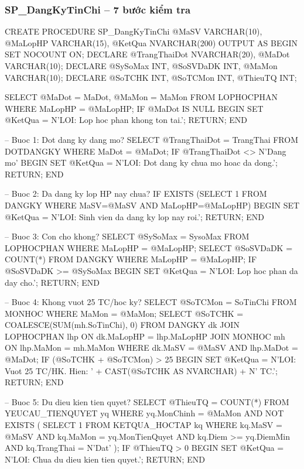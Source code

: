 \documentclass[13pt, a4paper]{article}
\begin{document}
\subsubsection{SP\_DangKyTinChi -- 7 bước kiểm tra}

\begin{sqlbox}
CREATE PROCEDURE SP_DangKyTinChi
    @MaSV    VARCHAR(10),
    @MaLopHP VARCHAR(15),
    @KetQua  NVARCHAR(200) OUTPUT
AS
BEGIN
    SET NOCOUNT ON;
    DECLARE @TrangThaiDot NVARCHAR(20), @MaDot VARCHAR(10);
    DECLARE @SySoMax INT, @SoSVDaDK INT, @MaMon VARCHAR(10);
    DECLARE @SoTCHK INT, @SoTCMon INT, @ThieuTQ INT;

    SELECT @MaDot = MaDot, @MaMon = MaMon
    FROM LOPHOCPHAN WHERE MaLopHP = @MaLopHP;
    IF @MaDot IS NULL
    BEGIN SET @KetQua = N'LOI: Lop hoc phan khong ton tai.'; RETURN; END

    -- Buoc 1: Dot dang ky dang mo?
    SELECT @TrangThaiDot = TrangThai FROM DOTDANGKY WHERE MaDot = @MaDot;
    IF @TrangThaiDot <> N'Dang mo'
    BEGIN SET @KetQua = N'LOI: Dot dang ky chua mo hoac da dong.'; RETURN; END

    -- Buoc 2: Da dang ky lop HP nay chua?
    IF EXISTS (SELECT 1 FROM DANGKY WHERE MaSV=@MaSV AND MaLopHP=@MaLopHP)
    BEGIN SET @KetQua = N'LOI: Sinh vien da dang ky lop nay roi.'; RETURN; END

    -- Buoc 3: Con cho khong?
    SELECT @SySoMax = SysoMax FROM LOPHOCPHAN WHERE MaLopHP = @MaLopHP;
    SELECT @SoSVDaDK = COUNT(*) FROM DANGKY WHERE MaLopHP = @MaLopHP;
    IF @SoSVDaDK >= @SySoMax
    BEGIN SET @KetQua = N'LOI: Lop hoc phan da day cho.'; RETURN; END

    -- Buoc 4: Khong vuot 25 TC/hoc ky?
    SELECT @SoTCMon = SoTinChi FROM MONHOC WHERE MaMon = @MaMon;
    SELECT @SoTCHK = COALESCE(SUM(mh.SoTinChi), 0)
    FROM DANGKY dk JOIN LOPHOCPHAN lhp ON dk.MaLopHP = lhp.MaLopHP
                   JOIN MONHOC mh     ON lhp.MaMon   = mh.MaMon
    WHERE dk.MaSV = @MaSV AND lhp.MaDot = @MaDot;
    IF (@SoTCHK + @SoTCMon) > 25
    BEGIN
        SET @KetQua = N'LOI: Vuot 25 TC/HK. Hien: '
                    + CAST(@SoTCHK AS NVARCHAR) + N' TC.'; RETURN;
    END

    -- Buoc 5: Du dieu kien tien quyet?
    SELECT @ThieuTQ = COUNT(*)
    FROM YEUCAU_TIENQUYET yq
    WHERE yq.MonChinh = @MaMon
    AND NOT EXISTS (
        SELECT 1 FROM KETQUA_HOCTAP kq
        WHERE kq.MaSV = @MaSV AND kq.MaMon = yq.MonTienQuyet
          AND kq.Diem >= yq.DiemMin AND kq.TrangThai = N'Dat'
    );
    IF @ThieuTQ > 0
    BEGIN SET @KetQua = N'LOI: Chua du dieu kien tien quyet.'; RETURN; END


\end{sqlbox}
\end{document}
